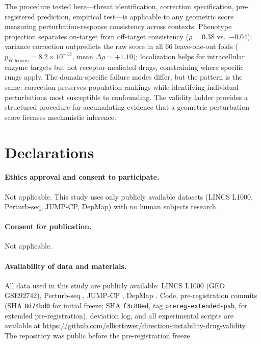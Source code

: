 \documentclass[10pt]{article}
\begin{document}
The procedure tested here---threat identification, correction
specification, pre-registered prediction, empirical test---is applicable
to any geometric score measuring perturbation-response consistency across
contexts. Phenotype projection separates on-target from off-target
consistency ($\rho = 0.38$ vs.\ $-0.04$); variance correction
outpredicts the raw score in all 66 leave-one-out folds
($p_{\text{Wilcoxon}} = 8.2 \times 10^{-13}$, mean
$\Delta\rho = +1.10$); localization helps for intracellular enzyme
targets but not receptor-mediated drugs, constraining where specific
rungs apply. The domain-specific failure modes differ, but the pattern
is the same: correction preserves population rankings while identifying
individual perturbations most susceptible to confounding. The validity
ladder provides a structured procedure for accumulating evidence that
a geometric perturbation score licenses mechanistic inference.

\section*{Declarations}

\paragraph{Ethics approval and consent to participate.}
Not applicable. This study uses only publicly available datasets
(LINCS L1000, Perturb-seq, JUMP-CP, DepMap) with no human subjects
research.

\paragraph{Consent for publication.}
Not applicable.

\paragraph{Availability of data and materials.}
All data used in this study are publicly available: LINCS L1000
(GEO GSE92742), Perturb-seq \citep{replogle2022mapping}, JUMP-CP
\citep{chandrasekaran2023jump}, DepMap \citep{dempster2021chronos}.
Code, pre-registration commits (SHA \texttt{8d74bd0} for initial
freeze; SHA \texttt{f3c88ed}, tag \texttt{prereg-extended-psb}, for
extended pre-registration), deviation log, and all experimental
scripts are available at
\url{https://github.com/elliottower/direction-instability-drug-validity}.
The repository was public before the pre-registration freeze.
\end{document}
